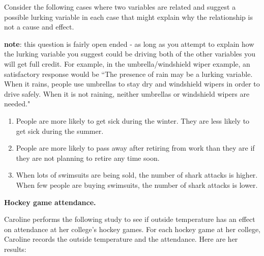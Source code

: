 \documentclass[11pt]{article}\usepackage[]{graphicx}\usepackage[]{color}
\newcommand{\ben}{\begin{enumerate}}
\newcommand{\een}{\end{enumerate}}
\renewcommand{\ans}[1]{}
\begin{document}
   Consider the following cases where two variables are related and suggest a possible lurking variable in each case that might explain why the relationship is not a cause and effect.

   \textbf{note}: this question is fairly open ended - as long as you attempt to explain how the lurking variable you suggest could be driving both of the other variables you will get full credit. For example, in the umbrella/windshield wiper example, an satisfactory response would be ``The presence of rain may be a lurking variable. When it rains, people use umbrellas to stay dry and windshield wipers in order to drive safely. When it is not raining, neither umbrellas or windshield wipers are needed."

   \ben
   \item People are more likely to get sick during the winter. They are less likely to get sick during the summer. \\
   \ans{ During the winter, people also tend to spend more time inside. Perhaps it is the \textbf{amount of time spent inside}, in closer contact with other people who may be sick which causes the change in the number of people falling ill.}

   \item People are more likely to pass away after retiring from work than they are if they are not planning to retire any time soon. \\
   \ans{People who retire are also generally older. If a person has no plans to retire any time soon, they may be earlier in their career. So, perhaps \textbf{age} is a potential lurking variable.}
 
   \item When lots of swimsuits are being sold, the number of shark attacks is higher. When few people are buying swimsuits, the number of shark attacks is lower. \\
   \ans{In this case the a potential lurking variable is the \textbf{the number of people swimming in the ocean} or perhaps, the season. In the summer people not only get themselves new swimsuits but they also get in the ocean with sharks in those swimsuits.}
   \een



\item \textbf{Hockey game attendance.}

Caroline performs the following study to see if outside temperature
has an effect on attendance at her college's hockey games. For each
hockey game at her college, Caroline records the outside temperature and the attendance. Here are her results:
\end{document}

